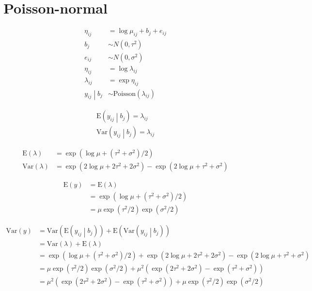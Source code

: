 \documentclass{article}
\begin{document}
\section{Poisson-normal}

\begin{align*}
\eta_{ij} & = \log{\mu_{ij}} + b_j + e_{ij} \\
b_j & \sim N\left(0, \tau^2\right) \\
e_{ij} & \sim N\left(0, \sigma^2\right) \\
\eta_{ij} & = \log{\lambda_{ij}} \\
\lambda_{ij} & = \exp{\eta_{ij}} \\
\left.y_{ij} \middle| b_j\right. & \sim \text{Poisson}\left(\lambda_{ij}\right)
\end{align*}

\begin{align*}
\text{E}\left(y_{ij} \middle| b_j\right) = \lambda_{ij} \\
\text{Var}\left(y_{ij} \middle| b_j\right) = \lambda_{ij}
\end{align*}

\begin{align*}
\text{E}\left(\lambda\right) & = \exp{\left(\log{\mu}+\left(\tau^2+\sigma^2\right) / 2\right)} \\
\text{Var}\left(\lambda\right) & = \exp{\left(2 \log{\mu} + 2\tau^2 + 2\sigma^2\right)} - \exp{\left(2\log{\mu} + \tau^2 +\sigma^2 \right)}
\end{align*}

\begin{align*}
\text{E}\left(y\right) & = \text{E}\left(\lambda\right) \\
& = \exp{\left(\log{\mu}+\left(\tau^2 + \sigma^2\right) / 2\right)} \\
& = \mu \exp{\left(\tau^2 / 2\right)} \exp{\left(\sigma^2 / 2\right)}
\end{align*}

\begin{align*}
\text{Var}\left(y\right) & = \text{Var}\left(\text{E}\left(y_{ij} \middle| b_j\right)\right) +
  \text{E}\left(\text{Var}\left(y_{ij} \middle| b_j\right)\right) \\
& = \text{Var}\left(\lambda\right) +
  \text{E}\left(\lambda\right) \\
& = \exp{\left(\log{\mu}+\left(\tau^2+\sigma^2\right) / 2\right)} +
  \exp{\left(2 \log{\mu} + 2\tau^2+2\sigma^2 \right)} -
  \exp{\left(2\log{\mu} + \tau^2+\sigma^2\right)} \\
& = \mu \exp\left(\tau^2 / 2\right) \exp\left(\sigma^2 / 2\right) +
  \mu^2 \left(\exp\left(2\tau^2 + 2\sigma^2\right) - \exp{\left(\tau^2 + \sigma^2\right)} \right) \\
& = \mu^2 \left(\exp\left(2\tau^2 + 2\sigma^2\right) - \exp{\left(\tau^2 + \sigma^2\right)} \right) +
  \mu \exp\left(\tau^2 / 2\right) \exp\left(\sigma^2 / 2\right)
\end{align*}
\end{document}
